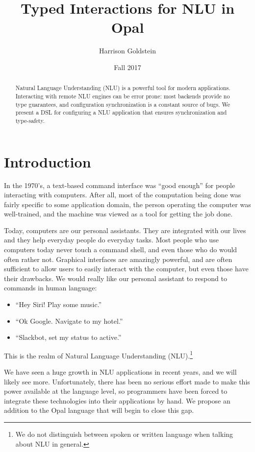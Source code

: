 \documentclass[twocolumn]{article}
\title{Typed Interactions for NLU in Opal}
\author{Harrison Goldstein}
\date{Fall 2017}
\begin{document}
\maketitle

\begin{abstract}
  Natural Language Understanding (NLU) is a powerful tool for modern
  applications. Interacting with remote NLU engines can be error prone: most
  backends provide no type guarantees, and configuration synchronization is a
  constant source of bugs. We present a DSL for configuring a NLU application
  that ensures synchronization and type-safety.
\end{abstract}

\section{Introduction} \label{introduction}
In the 1970's, a text-based command interface was ``good enough'' for people
interacting with computers. After all, most of the computation being done was
fairly specific to some application domain, the person operating the computer
was well-trained, and the machine was viewed as a tool for getting the job done.

Today, computers are our personal assistants. They are integrated with our lives
and they help everyday people do everyday tasks. Most people who use computers
today never touch a command shell, and even those who do would often rather not.
Graphical interfaces are amazingly powerful, and are often sufficient to allow
users to easily interact with the computer, but even those have their drawbacks.
We would really like our personal assistant to respond to commands in human
language:
\begin{itemize}
\item ``Hey Siri! Play some music.''
\item ``Ok Google. Navigate to my hotel.''
\item ``Slackbot, set my status to active.''
\end{itemize}
This is the realm of Natural Language Understanding (NLU).\footnote{We do not
  distinguish between spoken or written language when talking about NLU in
  general.}

We have seen a huge growth in NLU applications in recent years, and we will
likely see more. Unfortunately, there has been no serious effort made to make
this power available at the language level, so programmers have been forced to
integrate these technologies into their applications by hand. We propose an
addition to the Opal language that will begin to close this
gap.\cite{opal-arxiv}
\end{document}
